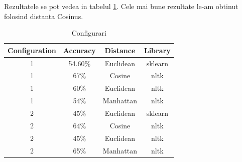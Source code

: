 \documentclass{article}
\begin{document}
Rezultatele se pot vedea in tabelul \ref{tab:resDist}. Cele mai bune rezultate le-am obtinut folosind distanta Cosinus.
\begin{table}[h!]
  \begin{center}
    \caption{Configurari}
    \label{tab:resDist}
    \begin{tabular}{c|c|c|c}
      \textbf{Configuration} & \textbf{Accuracy} & \textbf{Distance} & \textbf{Library} \\
      \hline
      1 & 54.60\% & Euclidean & sklearn \\
      1 & 67\% & Cosine & nltk \\
      1 & 60\% & Euclidean & nltk \\
      1 & 54\% & Manhattan & nltk \\
      2 & 45\% & Euclidean & sklearn \\
      2 & 64\% & Cosine & nltk \\
      2 & 45\% & Euclidean & nltk \\
      2 & 65\% & Manhattan & nltk \\
      \end{tabular}
  \end{center}
\end{table}



\newpage
 

\end{document}
